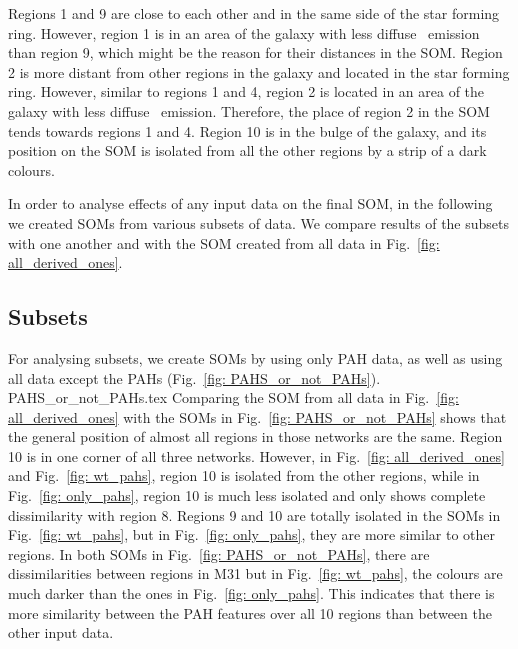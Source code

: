     Regions 1 and 9 are close to each other and in the same side of the star forming ring. 
    However, region 1 is in an area of the galaxy with less diffuse \halpha~emission than region 9, which might be the reason for their distances in the SOM.
    Region 2 is more distant from other regions in the galaxy and located in the star forming ring.
    However, similar to regions 1 and 4, region 2 is located in an area of the galaxy with less diffuse \halpha~emission.
    Therefore, the place of region 2 in the SOM tends towards regions 1 and 4. 
    Region 10 is in the bulge of the galaxy, and its position on the SOM is isolated from all the other regions by a strip of a dark colours. 
    
    In order to analyse effects of any input data on the final SOM, in the following we created SOMs from various subsets of data.
    We compare results of the subsets with one another and with the SOM created from all data in Fig.~\ref{fig: all_derived_ones}.

    \subsection{Subsets}
    \label{sec: subsets}
    
            For analysing subsets, we create SOMs by using only PAH data, as well as using all data except the PAHs (Fig.~\ref{fig: PAHS_or_not_PAHs}).
             {PAHS_or_not_PAHs.tex}
            Comparing the SOM from all data in Fig.~\ref{fig: all_derived_ones} with the SOMs in Fig.~\ref{fig: PAHS_or_not_PAHs} shows that the general position of almost all regions in those networks are the same. 
            Region 10 is in one corner of all three networks.
            However, in Fig.~\ref{fig: all_derived_ones} and Fig.~\ref{fig: wt_pahs}, region 10 is isolated from the other regions, while in Fig.~\ref{fig: only_pahs}, region 10 is much less isolated and only shows complete dissimilarity with region 8.
            Regions 9 and 10 are totally isolated in the SOMs in Fig.~\ref{fig: wt_pahs}, but in Fig.~\ref{fig: only_pahs}, they are more similar to other regions.
            In both SOMs in Fig.~\ref{fig: PAHS_or_not_PAHs}, there are dissimilarities between regions in M31 but in Fig.~\ref{fig: wt_pahs}, the colours are much darker than the ones in Fig.~\ref{fig: only_pahs}.
            This indicates that there is more similarity between the PAH features over all 10 regions than between the other input data.
            
